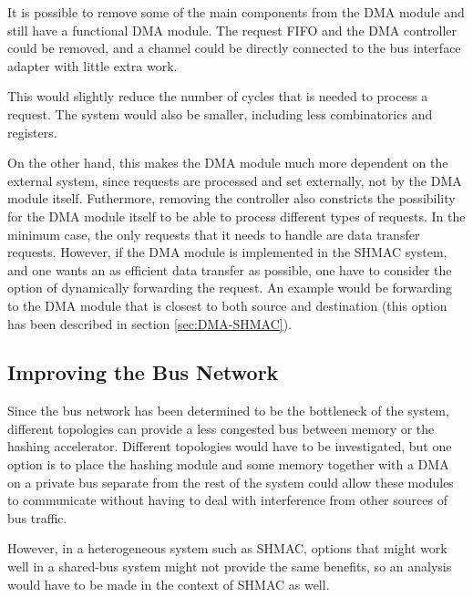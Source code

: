 It is possible to remove some of the main components from the DMA module and still
have a functional DMA module. The request FIFO and the DMA controller could be removed,
and a channel could be directly connected to the bus interface adapter with little
extra work.

This would slightly reduce the number of cycles that is needed to process a request.
The system would also be smaller, including less combinatorics and registers.

On the other hand, this makes the DMA module much more dependent on the external system, since requests are processed and set externally, not by the DMA module itself.
Futhermore, removing the controller also constricts the possibility for the DMA module itself to be able to process different types of requests.
In the minimum case, the only requests that it needs to handle are data transfer requests.
However, if the DMA module is implemented in the SHMAC system, and one wants an as efficient data transfer as possible, one have to consider the option of dynamically forwarding the request.
An example would be forwarding to the DMA module that is closest to both source and destination (this option has been described in section \ref{sec:DMA-SHMAC}).


\subsection{Improving the Bus Network}
Since the bus network has been determined to be the bottleneck of the system, different topologies
can provide a less congested bus between memory or the hashing accelerator. Different topologies
would have to be investigated, but one option is to place the hashing module and some memory together
with a DMA on a private bus separate from the rest of the system could allow these modules to
communicate without having to deal with interference from other sources of bus traffic.

However, in a heterogeneous system such as SHMAC, options that might work well in a shared-bus
system might not provide the same benefits, so an analysis would have to be made in the context
of SHMAC as well.

